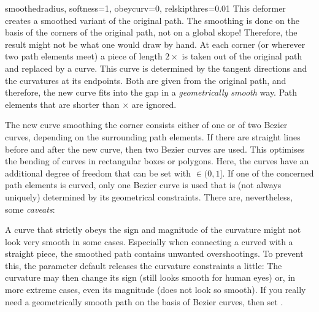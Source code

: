 \begin{classdesc}{smoothed}{radius, softness=1, obeycurv=0, relskipthres=0.01}
This deformer creates a smoothed variant of the original path. The smoothing is
done on the basis of the corners of the original path, not on a global skope!
Therefore, the result might not be what one would draw by hand. At each corner
(or wherever two path elements meet) a piece of length $2\times$ is
taken out of the original path and replaced by a curve. This curve is
determined by the tangent directions and the curvatures at its endpoints. Both
are given from the original path, and therefore, the new curve fits into the
gap in a \textit{geometrically smooth} way. Path elements that are shorter than
$\times$ are ignored.

The new curve smoothing the corner consists either of one or of two Bezier
curves, depending on the surrounding path elements. If there are straight lines
before and after the new curve, then two Bezier curves are used. This optimises
the bending of curves in rectangular boxes or polygons. Here, the curves have
an additional degree of freedom that can be set with  $\in(0,1]$.
If one of the concerned path elements is curved, only one Bezier curve is used
that is (not always uniquely) determined by its geometrical constraints. There
are, nevertheless, some \textit{caveats}:

A curve that strictly obeys the sign and magnitude of the curvature might not
look very smooth in some cases. Especially when connecting a curved with a
straight piece, the smoothed path contains unwanted overshootings. To prevent
this, the parameter default  releases the curvature constraints a
little: The curvature may then change its sign (still looks smooth for human
eyes) or, in more extreme cases, even its magnitude (does not look so smooth).
If you really need a geometrically smooth path on the basis of Bezier curves,
then set .
\end{classdesc}

